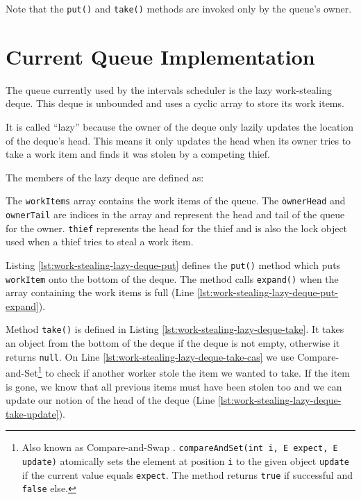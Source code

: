 Note that the \lstinline!put()! and \lstinline!take()! methods are
invoked only by the queue's owner.


\section{Current Queue Implementation}
\label{sec:queues-background-current-implementation}

The queue currently used by the intervals scheduler is the lazy
work-stealing deque. This deque is unbounded and uses a cyclic array
to store its work items.

It is called ``lazy'' because the owner of the deque only lazily
updates the location of the deque's head. This means it only updates
the head when its owner tries to take a work item and finds it was
stolen by a competing thief.

The members of the lazy deque are defined as:



The \lstinline!workItems! array contains the work items of the
queue. The \lstinline!ownerHead! and \lstinline!ownerTail! are indices
in the array and represent the head and tail of the queue for the
owner. \lstinline!thief! represents the head for the thief and is also
the lock object used when a thief tries to steal a work item.

Listing \ref{lst:work-stealing-lazy-deque-put} defines the
\lstinline!put()! method which puts \lstinline!workItem! onto the
bottom of the deque. The method calls \lstinline!expand()! when the
array containing the work items is full (Line
\ref{lst:work-stealing-lazy-deque-put-expand}).



\VerbatimFootnotes Method \lstinline!take()! is defined in Listing
\ref{lst:work-stealing-lazy-deque-take}. It takes an object from the
bottom of the deque if the deque is not empty, otherwise it returns
\lstinline!null!. On Line \ref{lst:work-stealing-lazy-deque-take-cas}
we use Compare-and-Set\footnote{Also known as Compare-and-Swap
  \cite{IBM1974}. \verb!compareAndSet(int i, E expect, E update)!
  atomically sets the element at position \verb!i! to the given object
  \verb!update! if the current value equals \verb!expect!. The method
  returns \verb!true! if successful and \verb!false! else.} to check
if another worker stole the item we wanted to take. If the item is
gone, we know that all previous items must have been stolen too and we
can update our notion of the head of the deque (Line
\ref{lst:work-stealing-lazy-deque-take-update}).

